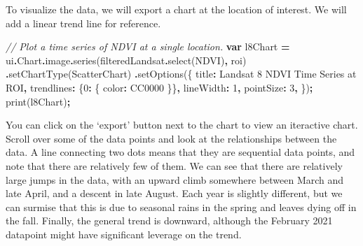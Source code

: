 \documentclass[
]{article}
\newenvironment{Shaded}{\begin{snugshade}}{\end{snugshade}}
\newcommand{\AttributeTok}[1]{\textcolor[rgb]{0.77,0.63,0.00}{#1}}
\newcommand{\CommentTok}[1]{\textcolor[rgb]{0.56,0.35,0.01}{\textit{#1}}}
\newcommand{\DataTypeTok}[1]{\textcolor[rgb]{0.13,0.29,0.53}{#1}}
\newcommand{\DecValTok}[1]{\textcolor[rgb]{0.00,0.00,0.81}{#1}}
\newcommand{\FunctionTok}[1]{\textcolor[rgb]{0.00,0.00,0.00}{#1}}
\newcommand{\KeywordTok}[1]{\textcolor[rgb]{0.13,0.29,0.53}{\textbf{#1}}}
\newcommand{\NormalTok}[1]{#1}
\newcommand{\OperatorTok}[1]{\textcolor[rgb]{0.81,0.36,0.00}{\textbf{#1}}}
\newcommand{\StringTok}[1]{\textcolor[rgb]{0.31,0.60,0.02}{#1}}
\begin{document}
To visualize the data, we will export a chart at the location of interest. We will add a linear trend line for reference.

\begin{Shaded}
\begin{Highlighting}[]
\CommentTok{// Plot a time series of NDVI at a single location.}
\KeywordTok{var}\NormalTok{ l8Chart }\OperatorTok{=}\NormalTok{ ui}\OperatorTok{.}\AttributeTok{Chart}\OperatorTok{.}\AttributeTok{image}\OperatorTok{.}\FunctionTok{series}\NormalTok{(filteredLandsat}\OperatorTok{.}\FunctionTok{select}\NormalTok{(}\StringTok{\textquotesingle{}NDVI\textquotesingle{}}\NormalTok{)}\OperatorTok{,}\NormalTok{ roi)}
  \OperatorTok{.}\FunctionTok{setChartType}\NormalTok{(}\StringTok{\textquotesingle{}ScatterChart\textquotesingle{}}\NormalTok{)}
  \OperatorTok{.}\FunctionTok{setOptions}\NormalTok{(\{}
   \DataTypeTok{title}\OperatorTok{:} \StringTok{\textquotesingle{}Landsat 8 NDVI Time Series at ROI\textquotesingle{}}\OperatorTok{,}
   \DataTypeTok{trendlines}\OperatorTok{:}\NormalTok{ \{}\DecValTok{0}\OperatorTok{:}\NormalTok{ \{}
                \DataTypeTok{color}\OperatorTok{:} \StringTok{\textquotesingle{}CC0000\textquotesingle{}}
\NormalTok{   \}\}}\OperatorTok{,}
   \DataTypeTok{lineWidth}\OperatorTok{:} \DecValTok{1}\OperatorTok{,}
   \DataTypeTok{pointSize}\OperatorTok{:} \DecValTok{3}\OperatorTok{,}
\NormalTok{  \})}\OperatorTok{;}
\FunctionTok{print}\NormalTok{(l8Chart)}\OperatorTok{;}
\end{Highlighting}
\end{Shaded}

You can click on the `export' button next to the chart to view an iteractive chart. Scroll over some of the data points and look at the relationships between the data. A line connecting two dots means that they are sequential data points, and note that there are relatively few of them. We can see that there are relatively large jumps in the data, with an upward climb somewhere between March and late April, and a descent in late August. Each year is slightly different, but we can surmise that this is due to seasonal rains in the spring and leaves dying off in the fall. Finally, the general trend is downward, although the February 2021 datapoint might have significant leverage on the trend.
\end{document}
